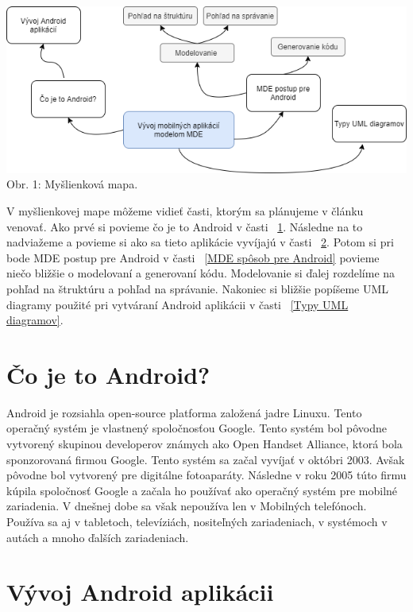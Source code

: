 \documentclass[10pt,twoside,slovak,a4paper]{article}
\begin{document}
\begin{center}
\includegraphics[scale=0.51]{myšlienková mapa.png}
Obr. 1: Myšlienková mapa.
\end{center}
V myšlienkovej mape môžeme vidieť časti, ktorým sa plánujeme v článku venovať. Ako prvé si povieme čo je to Android v časti ~\ref{Čo je to Android?}. Následne na to nadviažeme a povieme si ako sa tieto aplikácie vyvíjajú v časti ~\ref{Vývoj Android aplikácii}. 
Potom si pri bode MDE postup pre Android v časti ~\ref{MDE spôsob pre Android} povieme niečo bližšie o modelovaní a generovaní kódu. Modelovanie si ďalej rozdelíme na pohľad na štruktúru a pohľad na správanie. Nakoniec si bližšie popíšeme UML diagramy použité pri vytváraní Android aplikácii v časti ~\ref{Typy UML diagramov}.


\section{Čo je to Android?} \label{Čo je to Android?}
Android je rozsiahla open-source platforma založená jadre Linuxu. Tento operačný systém je vlastnený spoločnosťou Google. \cite{Android1}Tento systém bol pôvodne vytvorený skupinou developerov známych ako Open Handset Alliance, ktorá bola sponzorovaná firmou Google. \newline
Tento systém sa začal vyvíjať v októbri 2003. Avšak pôvodne bol vytvorený pre digitálne fotoaparáty. Následne v roku 2005 túto firmu kúpila spoločnosť Google a začala ho používať ako operačný systém pre mobilné zariadenia. \cite{Android2}\newline
V dnešnej dobe sa však nepoužíva len v  Mobilných telefónoch. Používa sa aj v tabletoch, televíziách, nositeľných zariadeniach, v systémoch v autách a mnoho ďalších zariadeniach.



\section{Vývoj Android aplikácii } \label{Vývoj Android aplikácii}
\end{document}
